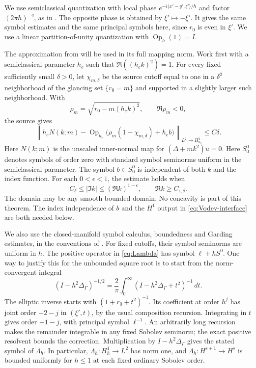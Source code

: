\documentclass[11pt,a4paper]{article}
\DeclareMathOperator{\Op}{Op}
\theoremstyle{remark}
\numberwithin{equation}{section}
\begin{document}
We use semiclassical quantization with local phase
$e^{-i\langle x'-y',\xi'\rangle/h}$ and factor $(2\pi h)^{-q}$,
as in \cite{Vdn}. The opposite phase is obtained by
$\xi'\mapsto-\xi'$. It gives the same symbol estimates and the same
principal symbols here, since $r_0$ is even in $\xi'$. We use a linear
partition-of-unity quantization with $\Op_h(1)=I$.

The approximation from \cite[Theorem~1.2]{Vdn} will be used in its full
mapping norm. Work first with a semiclassical parameter $h_e$ such that
$\Re((h_e k)^2)=1$. For every fixed sufficiently small $\delta>0$, let
$\chi_{m,\delta}$ be the source cutoff equal to one in a
$\delta^2$ neighborhood of the glancing set $\{r_0=m\}$ and supported
in a slightly larger such neighborhood. With
\[
 \rho_m=\sqrt{r_0-m(h_e k)^2},\qquad \Re\rho_m<0,
\]
the source gives
\begin{equation}\label{eq:Vodev-interface}
 \left\|h_eN(k;m)-\Op_{h_e}
 \big(\rho_m(1-\chi_{m,\delta})+h_e b\big)\right\|_{L^2\to H_{h_e}^1}
 \le C\delta.
\end{equation}
Here $N(k;m)$ is the unscaled inner-normal map for
$(\Delta+mk^2)u=0$. Here $S_0^0$ denotes symbols of order zero with standard symbol
seminorms uniform in the semiclassical parameter. The symbol $b\in S_0^0$
is independent of both $k$ and the index function. For each $0<\epsilon<1$, the estimate holds when
\[
 C_\delta\le|\Im k|\le(\Re k)^{1-\epsilon},\qquad
 \Re k\ge C_{\epsilon,\delta}.
\]
The domain may be any smooth bounded domain. No concavity is part of
this theorem. The index independence of $b$ and the $H^1$ output in
\eqref{eq:Vodev-interface} are both needed below.

We also use the closed-manifold symbol calculus, boundedness and Garding
estimates, in the conventions of \cite[Chapter~4 and Appendix~E]{EZ}.
For fixed cutoffs, their symbol seminorms are uniform in $h$.
The positive operator in \eqref{eq:Lambda} has symbol $\ell+hS^0$.
One way to justify this for the unbounded square root is to start from
the norm-convergent integral
\begin{equation}\label{eq:square-root-integral}
 (I-h^2\Delta_\Gamma)^{-1/2}
 =\frac2\pi\int_0^\infty(I-h^2\Delta_\Gamma+t^2)^{-1}\,dt.
\end{equation}
The elliptic inverse starts with $(1+r_0+t^2)^{-1}$. Its coefficient at
order $h^j$ has joint order $-2-j$ in $(\xi',t)$, by the usual
composition recursion. Integrating in $t$ gives order $-1-j$, with
principal symbol $\ell^{-1}$. An arbitrarily long recursion makes the
remainder integrable in any fixed Sobolev seminorm; the exact positive
resolvent bounds the correction. Multiplication by
$I-h^2\Delta_\Gamma$ gives the stated symbol of $\Lambda_h$.
In particular, $\Lambda_h:H_h^1\to L^2$ has norm one, and
$\Lambda_h:H^{s+1}\to H^s$ is bounded uniformly for $h\le1$ at each
fixed ordinary Sobolev order.
\end{document}
